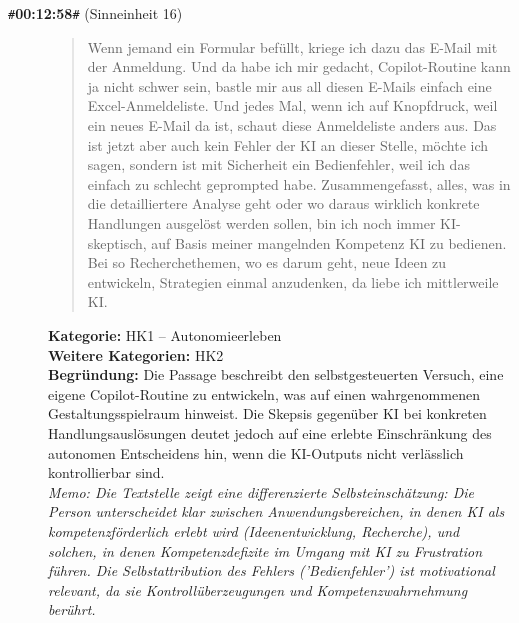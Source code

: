 \begin{description}
  \item[\texttt{\#}\textbf{00:12:58}\texttt{\#} (Sinneinheit 16)]
  \begin{quote}
  Wenn jemand ein Formular befüllt, kriege ich dazu das E-Mail mit der Anmeldung. Und da habe ich mir gedacht, Copilot-Routine kann ja nicht schwer sein, bastle mir aus all diesen E-Mails einfach eine Excel-Anmeldeliste. Und jedes Mal, wenn ich auf Knopfdruck, weil ein neues E-Mail da ist, schaut diese Anmeldeliste anders aus. Das ist jetzt aber auch kein Fehler der KI an dieser Stelle, möchte ich sagen, sondern ist mit Sicherheit ein Bedienfehler, weil ich das einfach zu schlecht geprompted habe. Zusammengefasst, alles, was in die detailliertere Analyse geht oder wo daraus wirklich konkrete Handlungen ausgelöst werden sollen, bin ich noch immer KI-skeptisch, auf Basis meiner mangelnden Kompetenz KI zu bedienen. Bei so Recherchethemen, wo es darum geht, neue Ideen zu entwickeln, Strategien einmal anzudenken, da liebe ich mittlerweile KI.
  \end{quote}
  \textbf{Kategorie:} HK1 -- Autonomieerleben\\
  \textbf{Weitere Kategorien:} HK2\\
  \textbf{Begr\"undung:} Die Passage beschreibt den selbstgesteuerten Versuch, eine eigene Copilot-Routine zu entwickeln, was auf einen wahrgenommenen Gestaltungsspielraum hinweist. Die Skepsis gegenüber KI bei konkreten Handlungsauslösungen deutet jedoch auf eine erlebte Einschränkung des autonomen Entscheidens hin, wenn die KI-Outputs nicht verlässlich kontrollierbar sind.
  \\\textit{Memo: Die Textstelle zeigt eine differenzierte Selbsteinschätzung: Die Person unterscheidet klar zwischen Anwendungsbereichen, in denen KI als kompetenzförderlich erlebt wird (Ideenentwicklung, Recherche), und solchen, in denen Kompetenzdefizite im Umgang mit KI zu Frustration führen. Die Selbstattribution des Fehlers ('Bedienfehler') ist motivational relevant, da sie Kontrollüberzeugungen und Kompetenzwahrnehmung berührt.}
\end{description}
\medskip

